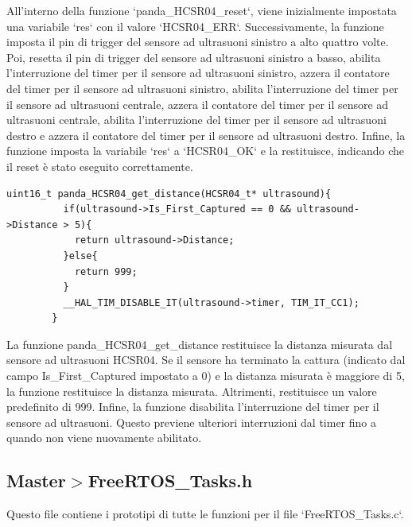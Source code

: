 \documentclass{article}
\begin{document}
      All'interno della funzione `panda\_HCSR04\_reset`, viene inizialmente impostata una variabile `res` con il valore `HCSR04\_ERR`. Successivamente, la funzione imposta il pin di trigger del sensore ad ultrasuoni sinistro a alto quattro volte. Poi, resetta il pin di trigger del sensore ad ultrasuoni sinistro a basso, abilita l'interruzione del timer per il sensore ad ultrasuoni sinistro, azzera il contatore del timer per il sensore ad ultrasuoni sinistro, abilita l'interruzione del timer per il sensore ad ultrasuoni centrale, azzera il contatore del timer per il sensore ad ultrasuoni centrale, abilita l'interruzione del timer per il sensore ad ultrasuoni destro e azzera il contatore del timer per il sensore ad ultrasuoni destro. Infine, la funzione imposta la variabile `res` a `HCSR04\_OK` e la restituisce, indicando che il reset è stato eseguito correttamente.

      \begin{lstlisting}[style=CStyle]
        uint16_t panda_HCSR04_get_distance(HCSR04_t* ultrasound){
          if(ultrasound->Is_First_Captured == 0 && ultrasound->Distance > 5){
            return ultrasound->Distance;
          }else{
            return 999;
          }
          __HAL_TIM_DISABLE_IT(ultrasound->timer, TIM_IT_CC1);
        }
      \end{lstlisting}
      La funzione panda\_HCSR04\_get\_distance restituisce la distanza misurata dal sensore ad ultrasuoni HCSR04. Se il sensore ha terminato la cattura (indicato dal campo Is\_First\_Captured impostato a 0) e la distanza misurata è maggiore di 5, la funzione restituisce la distanza misurata. Altrimenti, restituisce un valore predefinito di 999. Infine, la funzione disabilita l’interruzione del timer per il sensore ad ultrasuoni. Questo previene ulteriori interruzioni dal timer fino a quando non viene nuovamente abilitato.
    \subsection{Master$>$FreeRTOS\_Tasks.h}
    Questo file contiene i prototipi di tutte le funzioni per il file `FreeRTOS\_Tasks.c`.
\end{document}
